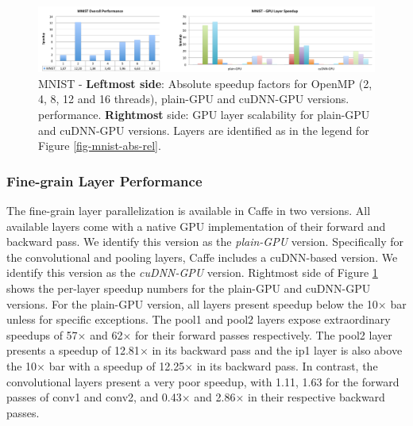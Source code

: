 
\begin{figure}[]
\includegraphics[width=\textwidth]{figures/mnist-abs-perf+gpu-layer.pdf}
\caption{MNIST - \textbf{Leftmost side}: Absolute speedup factors for OpenMP (2, 4, 8, 12 and 16 threads), plain-GPU and cuDNN-GPU versions. performance. \textbf{Rightmost} side: GPU layer scalability for plain-GPU and cuDNN-GPU versions. Layers are identified as in the legend for Figure \ref{fig-mnist-abs-rel}.}
\label{fig-mnist-overall}
\end{figure}

\subsubsection{Fine-grain Layer Performance}
The fine-grain layer parallelization is available in Caffe in two versions. 
All available layers come with a native GPU implementation of their 
forward and backward pass. We identify this version as the \emph{plain-GPU} 
version. Specifically for the convolutional and pooling layers, Caffe 
includes a cuDNN-based version. We identify this version as the 
\emph{cuDNN-GPU} version. 
Rightmost side of Figure \ref{fig-mnist-overall} shows the per-layer 
speedup numbers for the plain-GPU and cuDNN-GPU versions. 
For the plain-GPU version, all layers present speedup below 
the 10$\times$ bar unless for specific exceptions. The pool1 and pool2 
layers expose extraordinary speedups of 57$\times$ and 62$\times$ for their 
forward passes respectively. The pool2 layer presents a speedup of 
12.81$\times$ in its backward pass and the ip1 layer is also above the 
10$\times$ bar with a speedup of 12.25$\times$ in its backward pass.
In contrast, the convolutional layers present a very poor speedup, with 
1.11, 1.63 for the forward passes of conv1 and conv2, and 0.43$\times$ and 2.86$\times$ 
in their respective backward passes. 

